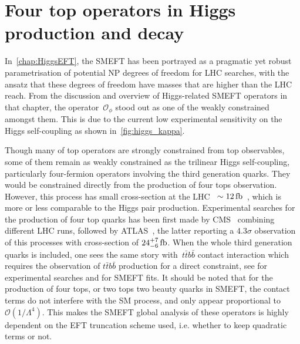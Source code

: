 

\chapter{ Four top operators in Higgs production and decay}\label{chap:4topSingleHiggs}
%
\par In~\autoref{chap:HiggsEFT}, the SMEFT has been portrayed as a pragmatic yet robust parametrisation of potential NP degrees of freedom for LHC searches, with the ansatz that these degrees of freedom have masses that are higher than the LHC reach. From the discussion and overview of Higgs-related SMEFT operators in that chapter, the operator~$ \mathcal O _{\phi}$ stood out as one of the weakly constrained amongst them. This is due to the current low experimental sensitivity on the Higgs self-coupling as shown in~\autoref{fig:higgs_kappa}. 
\par 
 Though many of top operators are strongly constrained from top observables, some of them remain as weakly constrained as the trilinear Higgs self-coupling, particularly four-fermion operators involving the third generation quarks. They would be constrained directly from the production of four tops observation. However, this process has small cross-section at the LHC~ $\sim12\, \femtobarn$~\cite{Frederix:2017wme}, which is more or less comparable to the Higgs pair production. Experimental searches for the production of four top quarks has been first made by CMS~\cite{Sirunyan:2019nxl} combining different LHC runs, followed by ATLAS~\cite{Aad:2020klt}, the latter reporting a $4.3 \sigma$ observation of this processes with cross-section of $24^{+7}_{-6}\,\femtobarn$. When the whole third generation quarks is included, one sees the same story with~$t\bar{t}b\bar{b}$ contact interaction which requires the observation of $t\bar{t}b\bar{b}$ production for a direct constraint, see \cite{Sirunyan:2020kgar, ATLAS:2018gug} for experimental searches and \cite{DHondt:2018cww, Hartland:2019bjb} for SMEFT fits. It should be noted that for the production of four tops, or two tops two beauty quarks in SMEFT, the contact terms do not interfere with the SM process, and only appear proportional to $\mathcal{O}(1/\Lambda^4)$. This makes the SMEFT global analysis of these operators is highly dependent on the EFT truncation scheme used, i.e. whether to keep quadratic terms or not. 
